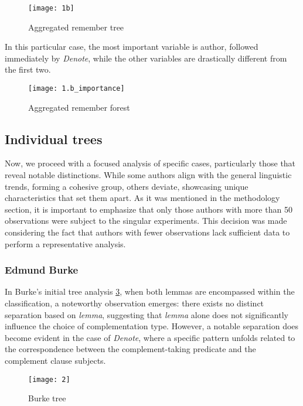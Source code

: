 \documentclass[final]{clv3} %
\begin{document}
\begin{figure}[htpb]
    \centering
    \texttt{[image: 1b]}
    \caption{Aggregated remember tree}
    \label{fig:3}
\end{figure}

In this particular case, the most important variable is author, followed immediately by \textit{Denote}, while the other variables are drastically different from the first two.

\begin{figure}[htpb]
    \centering
    \texttt{[image: 1.b\_importance]}
    \caption{Aggregated remember forest}
    \label{fig:13}
\end{figure}

\subsection{Individual trees}
Now, we proceed with a focused analysis of specific cases, particularly those that reveal notable distinctions. While some authors align with the general linguistic trends, forming a cohesive group, others deviate, showcasing unique characteristics that set them apart. As it was mentioned in the methodology section, it is important to emphasize that only those authors with more than 50 observations were subject to the singular experiments. This decision was made considering the fact that authors with fewer observations lack sufficient data to perform a representative analysis. 

\subsubsection{Edmund Burke}

In Burke's initial tree analysis \cref{fig:4}, when both lemmas are encompassed within the classification, a noteworthy observation emerges: there exists no distinct separation based on \textit{lemma}, suggesting that \textit{lemma} alone does not significantly influence the choice of complementation type. However, a notable separation does become evident in the case of \textit{\textit{Denote}}, where a specific pattern unfolds related to the correspondence between the complement-taking predicate and the complement clause subjects.

\begin{figure}[htpb]
    \centering
    \texttt{[image: 2]}
    \caption{Burke tree}
    \label{fig:4}
\end{figure}
\end{document}
